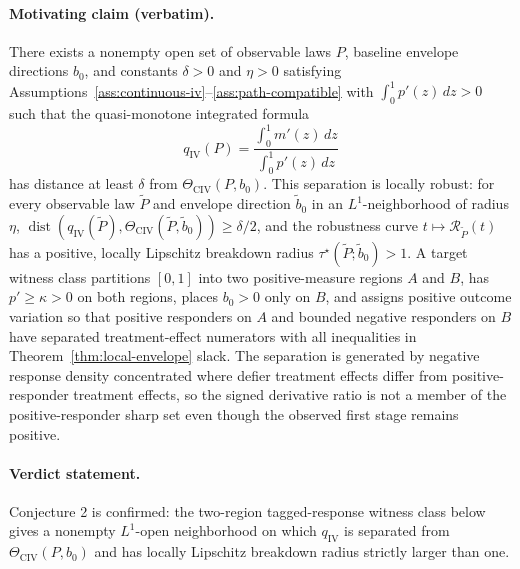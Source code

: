 \begin{theorem}\label{thm:strict-separation}
\paragraph{Motivating claim (verbatim).}
There exists a nonempty open set of observable laws \(P\), baseline envelope directions \(b_0\), and constants \(\delta>0\) and \(\eta>0\) satisfying Assumptions~\ref{ass:continuous-iv}--\ref{ass:path-compatible} with \(\int_0^1 p'(z)\,dz>0\) such that the quasi-monotone integrated formula
\[
q_{\mathrm{IV}}(P)=\frac{\int_0^1 m'(z)\,dz}{\int_0^1 p'(z)\,dz}
\]
has distance at least \(\delta\) from \(\Theta_{\mathrm{CIV}}(P,b_0)\).  This separation is locally robust: for every observable law \(\widetilde P\) and envelope direction \(\widetilde b_0\) in an \(L^1\)-neighborhood of radius \(\eta\), \(\operatorname{dist}(q_{\mathrm{IV}}(\widetilde P),\Theta_{\mathrm{CIV}}(\widetilde P,\widetilde b_0))\ge\delta/2\), and the robustness curve \(t\mapsto\mathcal R_{\widetilde P}(t)\) has a positive, locally Lipschitz breakdown radius \(\tau^\star(\widetilde P;\widetilde b_0)>1\).  A target witness class partitions \([0,1]\) into two positive-measure regions \(A\) and \(B\), has \(p'\ge\kappa>0\) on both regions, places \(b_0>0\) only on \(B\), and assigns positive outcome variation so that positive responders on \(A\) and bounded negative responders on \(B\) have separated treatment-effect numerators with all inequalities in Theorem~\ref{thm:local-envelope} slack.  The separation is generated by negative response density concentrated where defier treatment effects differ from positive-responder treatment effects, so the signed derivative ratio is not a member of the positive-responder sharp set even though the observed first stage remains positive.

\paragraph{Verdict statement.}
Conjecture 2 is confirmed: the two-region tagged-response witness class below gives a nonempty \(L^1\)-open neighborhood on which \(q_{\mathrm{IV}}\) is separated from \(\Theta_{\mathrm{CIV}}(P,b_0)\) and has locally Lipschitz breakdown radius strictly larger than one.


\end{theorem}
